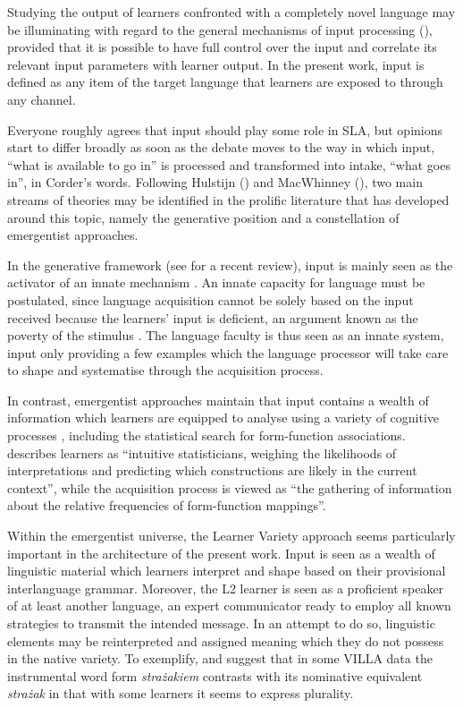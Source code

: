 Studying the output of learners confronted with a completely novel language may be illuminating with regard to the general mechanisms of input processing (\citealt{Perdue2002}), provided that it is possible to have full control over the input and correlate its relevant input parameters with learner output. In the present work, input is defined as any item of the target language that learners are exposed to through any channel.

Everyone roughly agrees that input should play some role in SLA, but opinions start to differ broadly as soon as the debate moves to the way in which input, “what is available to go in” is processed and transformed into intake, “what goes in”, in Corder's \citeyear{Corder1967} words. Following Hulstijn (\citeyear{Hulstijn2015}) and MacWhinney (\citeyear{kail_tale_2010,macwhinney_language_2015}), two main streams of theories may be identified in the prolific literature that has developed around this topic, namely the generative position and a constellation of emergentist approaches.

In the generative framework (see \citealt{RankinUnsworth2016} for a recent review), input is mainly seen as the activator of an innate mechanism \citep{Chomsky1981}. An innate capacity for language must be postulated, since language acquisition cannot be solely based on the input received because the learners’ input is deficient, an argument known as the poverty of the stimulus \citep{Chomsky1980}. The language faculty is thus seen as an innate system, input only providing a few examples which the language processor will take care to shape and systematise through the acquisition process.

In contrast, emergentist approaches maintain that input contains a wealth of information which learners are equipped to analyse using a variety of cognitive processes \citep{Tomasello2005}, including the statistical search for form-function associations.  \citet[1]{Ellis2006b} describes learners as “intuitive statisticians, weighing the likelihoods of interpretations and predicting which constructions are likely in the current context”, while the acquisition process is viewed as “the gathering of information about the relative frequencies of form-function mappings”.

Within the emergentist universe, the Learner Variety approach seems particularly important in the architecture of the present work. Input is seen as a wealth of linguistic material which learners interpret and shape based on their provisional interlanguage grammar. Moreover, the L2 learner is seen as a proficient speaker of at least another language, an expert communicator ready to employ all known strategies to transmit the intended message. In an attempt to do so, linguistic elements may be reinterpreted and assigned meaning which they do not possess in the native variety. To exemplify, \citet{Bernini2018} and \citet[28--33]{Dimroth2018} suggest that in some VILLA data the instrumental word form \textit{strażakiem} contrasts with its nominative equivalent \textit{strażak} in that with some learners it seems to express plurality.

